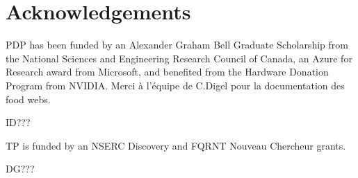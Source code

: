 \documentclass[letterpaper]{article}
\begin{document}
\section{Acknowledgements}

PDP has been funded by an Alexander Graham Bell Graduate Scholarship from the
National Sciences and Engineering Research Council of Canada, an Azure for
Research award from Microsoft, and benefited from the Hardware Donation Program
from NVIDIA.
Merci à l'équipe de C.Digel pour la documentation des food webs.

ID???

TP is funded by an NSERC Discovery and FQRNT Nouveau Chercheur grants.

DG???



\end{document}
